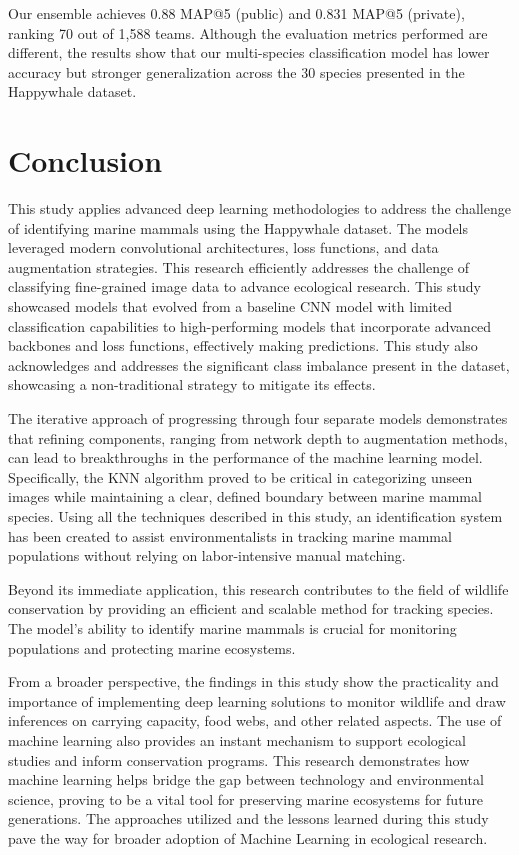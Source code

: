 \documentclass[twocolumn]{article}
\begin{document}
Our ensemble achieves 0.88 MAP@5 (public) and 0.831 MAP@5 (private), ranking 70 out of 1,588 teams. Although the evaluation metrics performed are different, the results show that our multi-species classification model has lower accuracy but stronger generalization across the 30 species presented in the Happywhale dataset.

\section{Conclusion}

This study applies advanced deep learning methodologies to address the challenge of identifying marine mammals using the Happywhale dataset. The models leveraged modern convolutional architectures, loss functions, and data augmentation strategies. This research efficiently addresses the challenge of classifying fine-grained image data to advance ecological research. This study showcased models that evolved from a baseline CNN model with limited classification capabilities to high-performing models that incorporate advanced backbones and loss functions, effectively making predictions. This study also acknowledges and addresses the significant class imbalance present in the dataset, showcasing a non-traditional strategy to mitigate its effects.  

The iterative approach of progressing through four separate models demonstrates that refining components, ranging from network depth to augmentation methods, can lead to breakthroughs in the performance of the machine learning model. Specifically, the KNN algorithm proved to be critical in categorizing unseen images while maintaining a clear, defined boundary between marine mammal species. Using all the techniques described in this study, an identification system has been created to assist environmentalists in tracking marine mammal populations without relying on labor-intensive manual matching.

Beyond its immediate application, this research contributes to the field of wildlife conservation by providing an efficient and scalable method for tracking species. The model's ability to identify marine mammals is crucial for monitoring populations and protecting marine ecosystems.

From a broader perspective, the findings in this study show the practicality and importance of implementing deep learning solutions to monitor wildlife and draw inferences on carrying capacity, food webs, and other related aspects. The use of machine learning also provides an instant mechanism to support ecological studies and inform conservation programs. This research demonstrates how machine learning helps bridge the gap between technology and environmental science, proving to be a vital tool for preserving marine ecosystems for future generations. The approaches utilized and the lessons learned during this study pave the way for broader adoption of Machine Learning in ecological research. 
\end{document}

